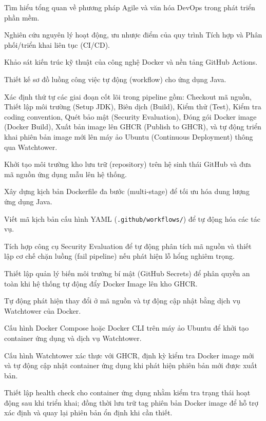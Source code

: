 \documentclass[12pt,a4paper,oneside]{extreport}
\begin{document}
Tìm hiểu tổng quan về phương pháp Agile và văn hóa DevOps trong phát triển phần
mềm.

Nghiên cứu nguyên lý hoạt động, ưu nhược điểm của quy trình Tích hợp và Phân
phối/triển khai liên tục (CI/CD).

Khảo sát kiến trúc kỹ thuật của công nghệ Docker và nền tảng GitHub Actions.

Thiết kế sơ đồ luồng công việc tự động (workflow) cho ứng dụng Java.

Xác định thứ tự các giai đoạn cốt lõi trong pipeline gồm: Checkout mã nguồn,
Thiết lập môi trường (Setup JDK), Biên dịch (Build), Kiểm thử (Test), Kiểm tra
coding convention, Quét bảo mật (Security Evaluation), Đóng gói Docker image
(Docker Build), Xuất bản image lên GHCR (Publish to GHCR), và tự động triển khai
phiên bản image mới lên máy ảo Ubuntu (Continuous Deployment) thông qua
Watchtower.

Khởi tạo môi trường kho lưu trữ (repository) trên hệ sinh thái GitHub và đưa mã
nguồn ứng dụng mẫu lên hệ thống.

Xây dựng kịch bản Dockerfile đa bước (multi-stage) để tối ưu hóa dung lượng ứng
dụng Java.

Viết mã kịch bản cấu hình YAML (\texttt{.github/workflows/}) để tự động hóa các
tác vụ.

Tích hợp công cụ Security Evaluation để tự động phân tích mã nguồn và thiết lập
cơ chế chặn luồng (fail pipeline) nếu phát hiện lỗ hổng nghiêm trọng.

Thiết lập quản lý biến môi trường bí mật (GitHub Secrets) để phân quyền an toàn
khi hệ thống tự động đẩy Docker Image lên kho GHCR.

Tự động phát hiện thay đổi ở mã nguồn và tự động cập nhật bằng dịch vụ
Watchtower của Docker.

Cấu hình Docker Compose hoặc Docker CLI trên máy ảo Ubuntu để khởi tạo
container ứng dụng và dịch vụ Watchtower.

Cấu hình Watchtower xác thực với GHCR, định kỳ kiểm tra Docker image mới và tự
động cập nhật container ứng dụng khi phát hiện phiên bản mới được xuất bản.

Thiết lập health check cho container ứng dụng nhằm kiểm tra trạng thái hoạt
động sau khi triển khai; đồng thời lưu trữ tag phiên bản Docker image để hỗ trợ
xác định và quay lại phiên bản ổn định khi cần thiết.
\end{document}
